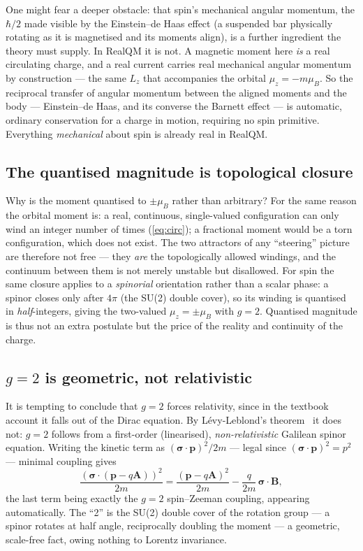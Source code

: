 \documentclass[11pt]{article}
\begin{document}
One might fear a deeper obstacle: that spin's mechanical angular momentum, the $\hbar/2$ made visible by the
Einstein--de Haas effect (a suspended bar physically rotating as it is magnetised and its moments align), is a
further ingredient the theory must supply. In RealQM it is not. A magnetic moment here \emph{is} a real
circulating charge, and a real current carries real mechanical angular momentum by construction --- the same
$L_z$ that accompanies the orbital $\mu_z=-m\mu_B$. So the reciprocal transfer of angular momentum between the
aligned moments and the body --- Einstein--de Haas, and its converse the Barnett effect --- is automatic, ordinary
conservation for a charge in motion, requiring no spin primitive. Everything \emph{mechanical} about spin is
already real in RealQM.

\subsection{The quantised magnitude is topological closure}

Why is the moment quantised to $\pm\mu_B$ rather than arbitrary? For the same reason the orbital moment is: a
real, continuous, single-valued configuration can only wind an integer number of times (\eqref{eq:circ}); a
fractional moment would be a torn configuration, which does not exist. The two attractors of any ``steering''
picture are therefore not free --- they \emph{are} the topologically allowed windings, and the continuum between
them is not merely unstable but disallowed. For spin the same closure applies to a \emph{spinorial} orientation
rather than a scalar phase: a spinor closes only after $4\pi$ (the SU(2) double cover), so its winding is
quantised in \emph{half}-integers, giving the two-valued $\mu_z=\pm\mu_B$ with $g=2$. Quantised magnitude is thus
not an extra postulate but the price of the reality and continuity of the charge.

\subsection{\texorpdfstring{$g=2$}{g=2} is geometric, not relativistic}

It is tempting to conclude that $g=2$ forces relativity, since in the textbook account it falls out of the Dirac
equation. By Lévy-Leblond's theorem~\cite{LevyLeblond} it does not: $g=2$ follows from a first-order
(linearised), \emph{non-relativistic} Galilean spinor equation. Writing the kinetic term as
$(\boldsymbol\sigma\!\cdot\!\mathbf p)^2/2m$ --- legal since $(\boldsymbol\sigma\!\cdot\!\mathbf p)^2=p^2$ ---
minimal coupling gives
\begin{equation}
\frac{(\boldsymbol\sigma\!\cdot\!(\mathbf p-q\mathbf A))^2}{2m}
= \frac{(\mathbf p-q\mathbf A)^2}{2m}-\frac{q}{2m}\,\boldsymbol\sigma\!\cdot\!\mathbf B,
\label{eq:pauli}
\end{equation}
the last term being exactly the $g=2$ spin--Zeeman coupling, appearing automatically. The ``2'' is the SU(2)
double cover of the rotation group --- a spinor rotates at half angle, reciprocally doubling the moment --- a
geometric, scale-free fact, owing nothing to Lorentz invariance.
\end{document}
